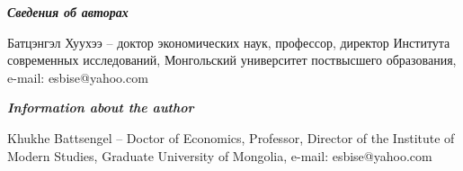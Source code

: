 \emph{{\bfseries Сведения об авторах}}

\begin{noparindent}
Батцэнгэл Хуухээ -- доктор экономических наук, профессор, директор
Института современных исследований, Монгольский университет поствысшего
образования, e-mail: esbise@yahoo.com
\end{noparindent}

\emph{{\bfseries Information about the author}}

\begin{noparindent}
Khukhe Battsengel -- Doctor of Economics, Professor, Director of the
Institute of Modern Studies, Graduate University of Mongolia, e-mail:
esbise@yahoo.com
\end{noparindent}
